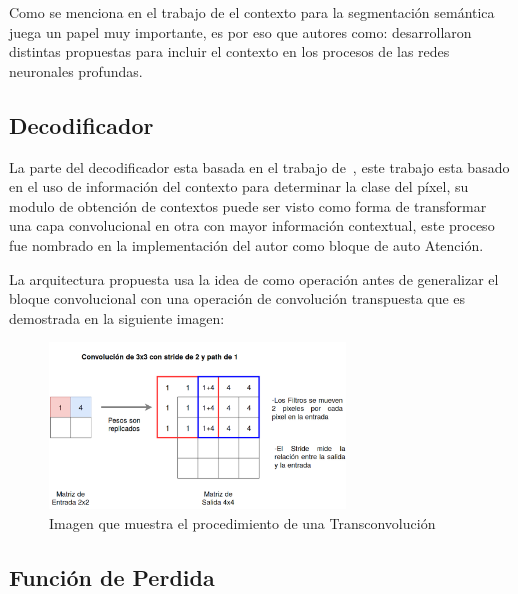 Como se menciona en el trabajo de \cite{Liu2015} el contexto para la segmentación semántica juega un papel muy importante, es por eso que autores como: \cite{Liu2015,Yuan2018 ,zhao2017pyramid} desarrollaron distintas propuestas para incluir el contexto en los procesos de las redes neuronales profundas.



\subsection{Decodificador}

La parte del decodificador esta basada en el trabajo de~\cite{Yuan2018}, este trabajo esta basado en el uso de información del contexto para determinar la clase del píxel, su modulo de obtención de contextos puede ser visto como forma de transformar una capa convolucional en otra con mayor información contextual, este proceso fue nombrado en la implementación del autor como bloque de auto Atención. 




La arquitectura propuesta usa la idea de \cite{Yuan2018} como operación antes de generalizar el bloque convolucional con una operación de convolución transpuesta que es demostrada en la siguiente imagen:
\begin{figure}[H]
	\centering
		\includegraphics[width=0.7\textwidth]{06changedetection/Transconvolucion.png} 
	
	
	\caption[Procedimiento de una Transconvolución]{Imagen que muestra el procedimiento de una Transconvolución 
}
	\label{fig:Senett}
\end{figure}

\subsection{Función de Perdida }



